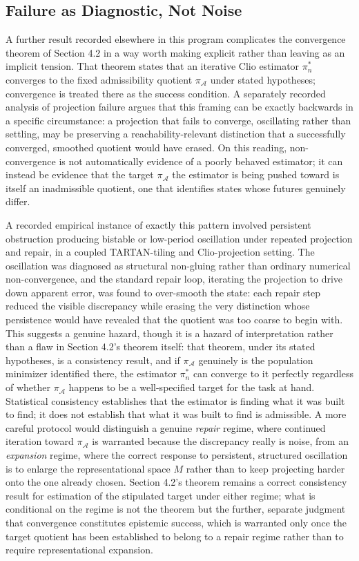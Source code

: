\documentclass[11pt]{article}
\begin{document}
\subsection{Failure as Diagnostic, Not Noise}

A further result recorded elsewhere in this program complicates the convergence theorem of Section 4.2 in a way worth making explicit rather than leaving as an implicit tension. That theorem states that an iterative Clio estimator $\pi_n^{*}$ converges to the fixed admissibility quotient $\pi_{\mathcal{A}}$ under stated hypotheses; convergence is treated there as the success condition. A separately recorded analysis of projection failure argues that this framing can be exactly backwards in a specific circumstance: a projection that fails to converge, oscillating rather than settling, may be preserving a reachability-relevant distinction that a successfully converged, smoothed quotient would have erased. On this reading, non-convergence is not automatically evidence of a poorly behaved estimator; it can instead be evidence that the target $\pi_{\mathcal{A}}$ the estimator is being pushed toward is itself an inadmissible quotient, one that identifies states whose futures genuinely differ.

A recorded empirical instance of exactly this pattern involved persistent obstruction producing bistable or low-period oscillation under repeated projection and repair, in a coupled TARTAN-tiling and Clio-projection setting. The oscillation was diagnosed as structural non-gluing rather than ordinary numerical non-convergence, and the standard repair loop, iterating the projection to drive down apparent error, was found to over-smooth the state: each repair step reduced the visible discrepancy while erasing the very distinction whose persistence would have revealed that the quotient was too coarse to begin with. This suggests a genuine hazard, though it is a hazard of interpretation rather than a flaw in Section 4.2's theorem itself: that theorem, under its stated hypotheses, is a consistency result, and if $\pi_{\mathcal{A}}$ genuinely is the population minimizer identified there, the estimator $\pi_n^{*}$ can converge to it perfectly regardless of whether $\pi_{\mathcal{A}}$ happens to be a well-specified target for the task at hand. Statistical consistency establishes that the estimator is finding what it was built to find; it does not establish that what it was built to find is admissible. A more careful protocol would distinguish a genuine \emph{repair} regime, where continued iteration toward $\pi_{\mathcal{A}}$ is warranted because the discrepancy really is noise, from an \emph{expansion} regime, where the correct response to persistent, structured oscillation is to enlarge the representational space $M$ rather than to keep projecting harder onto the one already chosen. Section 4.2's theorem remains a correct consistency result for estimation of the stipulated target under either regime; what is conditional on the regime is not the theorem but the further, separate judgment that convergence constitutes epistemic success, which is warranted only once the target quotient has been established to belong to a repair regime rather than to require representational expansion.
\end{document}
